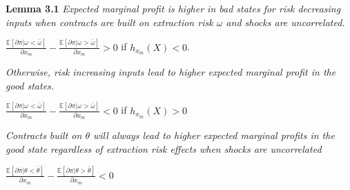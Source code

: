 \documentclass[
  letterpaper,
  DIV=11,
  numbers=noendperiod]{scrartcl}
\theoremstyle{plain}
\theoremstyle{plain}
\theoremstyle{remark}
\begin{document}
\textbf{Lemma 3.1} \emph{Expected marginal profit is higher in bad
states for risk decreasing inputs when contracts are built on extraction
risk \(\omega\) and shocks are uncorrelated.}

\(\frac{\mathbb{E}[\partial \pi|\omega<\bar \omega]}{\partial x_m}-\frac{\mathbb{E}[\partial \pi|\omega>\bar \omega]}{\partial x_m}>0\)
if \(h_{x_m}(X)<0\).

\emph{Otherwise, risk increasing inputs lead to higher expected marginal
profit in the good states.}

\(\frac{\mathbb{E}[\partial \pi|\omega<\bar \omega]}{\partial x_m}-\frac{\mathbb{E}[\partial \pi|\omega>\bar \omega]}{\partial x_m}<0\)
if \(h_{x_m}(X)>0\)

\emph{Contracts built on \(\theta\) will always lead to higher expected
marginal profits in the good state regardless of extraction risk effects
when shocks are uncorrelated}

\(\frac{\mathbb{E}[\partial \pi|\theta<\bar \theta]}{\partial x_m}-\frac{\mathbb{E}[\partial \pi|\theta>\bar \theta]}{\partial x_m}<0\)
\end{document}
